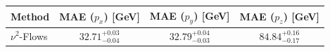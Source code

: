     \begin{tabular}{lccc}
        \toprule
        Method & MAE ($p_x$) [GeV] & MAE ($p_y$) [GeV] & MAE ($p_z$) [GeV] \\
        \midrule
        $\nu^2$-Flows & $32.71^{+0.03}_{-0.04}$ & $32.79^{+0.04}_{-0.03}$ & $84.84^{+0.16}_{-0.17}$ \\
        \bottomrule
    \end{tabular}